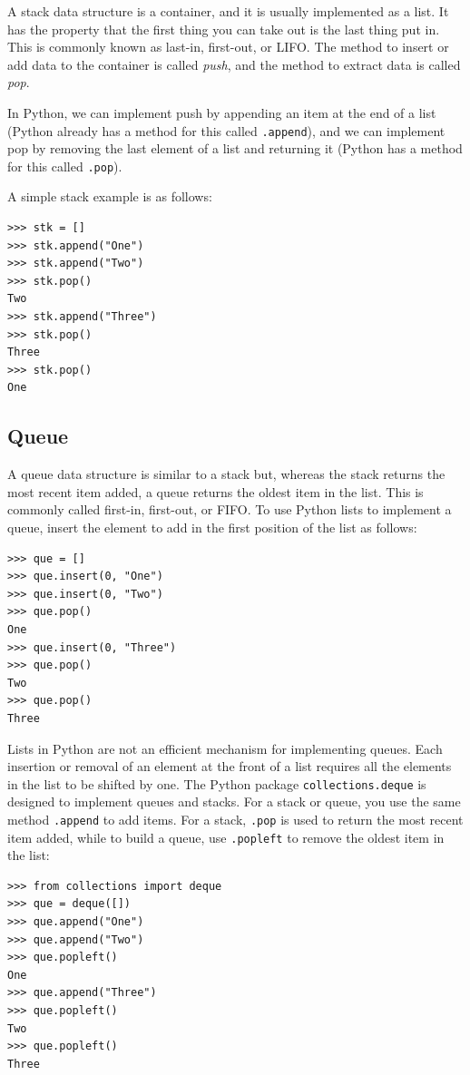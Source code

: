 \documentclass[justified, sixbynine]{tufte-book}
\def\ft{\small\tt}
\theoremstyle{plain}%
\newtheorem * {corollary}{Corollary}
\theoremstyle{definition}
\theoremstyle{remark}
\newtheorem * {remark}{Remark}
\newtheorem * {note}{Note}
\begin{document}
\begin{fullwidth}
A stack data structure is a container, and it is usually implemented as a list. It has the property that the first thing you can take out is the last thing put in. This is commonly known as last-in, first-out, or LIFO. The method to insert or add data to the container is called {\it push}, and the method to extract data is called {\it pop}.

In Python, we can implement push by appending an item at the end of a list (Python already has a method for this called {\ft .append}), and we can implement pop by removing the last element of a list and returning it (Python has a method for this called {\ft .pop}).

A simple stack example is as follows:

\begin{lstlisting}
>>> stk = []
>>> stk.append("One")
>>> stk.append("Two")
>>> stk.pop()
Two
>>> stk.append("Three")
>>> stk.pop()
Three
>>> stk.pop()
One
\end{lstlisting}


\goodbreak\subsection{Queue}

A queue data structure is similar to a stack but, whereas the stack returns the most recent item added, a queue returns the oldest item in the list.  This is commonly called first-in, first-out, or FIFO.  To use Python lists to implement a queue, insert the element to add in the first position of the list as follows:

\begin{lstlisting}
>>> que = []
>>> que.insert(0, "One")
>>> que.insert(0, "Two")
>>> que.pop()
One
>>> que.insert(0, "Three")
>>> que.pop()
Two
>>> que.pop()
Three
\end{lstlisting}

Lists in Python are not an efficient mechanism for implementing queues.  Each insertion or removal of an element at the front of a list requires all the elements in the list to be shifted by one. The Python package {\ft collections.deque} is designed to implement queues and stacks.  For a stack or queue, you use the same method {\ft .append} to add items.  For a stack, {\ft .pop} is used to return the most recent item added, while to build a queue, use {\ft .popleft} to remove the oldest item in the list:

\begin{lstlisting}
>>> from collections import deque
>>> que = deque([])
>>> que.append("One")
>>> que.append("Two")
>>> que.popleft()
One
>>> que.append("Three")
>>> que.popleft()
Two
>>> que.popleft()
Three
\end{lstlisting}



\end{fullwidth}
\end{document}
